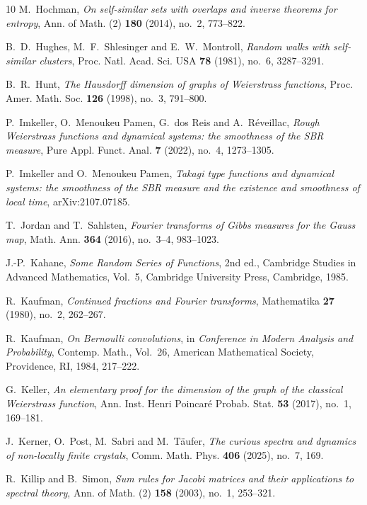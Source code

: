 \documentclass[11pt]{amsart}
\theoremstyle{plain}
\theoremstyle{definition}
\numberwithin{equation}{section}
\begin{document}
\begin{thebibliography}{10}
M.~Hochman,
\emph{On self-similar sets with overlaps and inverse theorems for entropy},
Ann. of Math. (2) \textbf{180} (2014), no.~2, 773--822.

B.~D.~Hughes, M.~F.~Shlesinger and E.~W.~Montroll,
\emph{Random walks with self-similar clusters},
Proc. Natl. Acad. Sci. USA \textbf{78} (1981), no.~6, 3287--3291.

B.~R.~Hunt,
\emph{The Hausdorff dimension of graphs of Weierstrass functions},
Proc. Amer. Math. Soc. \textbf{126} (1998), no.~3, 791--800.

P.~Imkeller, O.~Menoukeu Pamen, G.~dos Reis and A.~R\'eveillac,
\emph{Rough Weierstrass functions and dynamical systems: the smoothness of the SBR measure},
Pure Appl. Funct. Anal. \textbf{7} (2022), no.~4, 1273--1305.

P.~Imkeller and O.~Menoukeu Pamen,
\emph{Takagi type functions and dynamical systems: the smoothness of the SBR measure and the existence and smoothness of local time},
arXiv:2107.07185.

T.~Jordan and T.~Sahlsten,
\emph{Fourier transforms of Gibbs measures for the Gauss map},
Math. Ann. \textbf{364} (2016), no.~3--4, 983--1023.

J.-P.~Kahane,
\emph{Some Random Series of Functions},
2nd ed.,
Cambridge Studies in Advanced Mathematics, Vol.~5,
Cambridge University Press, Cambridge, 1985.

R.~Kaufman,
\emph{Continued fractions and Fourier transforms},
Mathematika \textbf{27} (1980), no.~2, 262--267.

R.~Kaufman,
\emph{On Bernoulli convolutions},
in \emph{Conference in Modern Analysis and Probability},
Contemp. Math., Vol.~26,
American Mathematical Society, Providence, RI, 1984, 217--222.

G.~Keller,
\emph{An elementary proof for the dimension of the graph of the classical Weierstrass function},
Ann. Inst. Henri Poincar\'e Probab. Stat. \textbf{53} (2017), no.~1, 169--181.

J.~Kerner, O.~Post, M.~Sabri and M.~T\"aufer,
\emph{The curious spectra and dynamics of non-locally finite crystals},
Comm. Math. Phys. \textbf{406} (2025), no.~7, 169.

R.~Killip and B.~Simon,
\emph{Sum rules for Jacobi matrices and their applications to spectral theory},
Ann. of Math. (2) \textbf{158} (2003), no.~1, 253--321.


\end{thebibliography}
\end{document}
